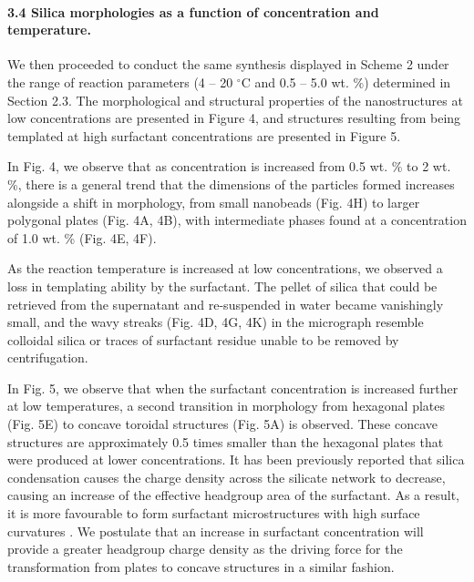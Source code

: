 \documentclass[a4paper,12pt,twocolumn]{article}
\begin{document}
  	\paragraph{3.4 Silica morphologies as a function of concentration and temperature.} We then proceeded to conduct the same synthesis displayed in Scheme 2 under the range of reaction parameters (4 -- 20 $^\circ$C and 0.5 -- 5.0 wt. \%) determined in Section 2.3. The morphological and structural properties of the nanostructures at low concentrations are presented in Figure 4, and structures resulting from being templated at high surfactant concentrations are presented in Figure 5.
  	
	
  	
  	In Fig. 4, we observe that as concentration is increased from 0.5 wt. \% to 2 wt. \%, there is a general trend that the dimensions of the particles formed increases alongside a shift in morphology, from small nanobeads (Fig. 4H) to larger polygonal plates (Fig. 4A, 4B), with intermediate phases found at a concentration of 1.0 wt. \% (Fig. 4E, 4F). 

  	As the reaction temperature is increased at low concentrations, we observed a loss in templating ability by the surfactant. The pellet of silica that could be retrieved from the supernatant and re-suspended in water became vanishingly small, and the wavy streaks (Fig. 4D, 4G, 4K) in the micrograph resemble colloidal silica or traces of surfactant residue unable to be removed by centrifugation.
  	
  	In Fig. 5, we observe that when the surfactant concentration is increased further at low temperatures, a second transition in morphology from hexagonal plates (Fig. 5E) to concave toroidal structures (Fig. 5A) is observed. These concave structures are approximately 0.5 times smaller than the hexagonal plates that were produced at lower concentrations. It has been previously reported that silica condensation causes the charge density across the silicate network to decrease, causing an increase of the effective headgroup area of the surfactant. As a result, it is more favourable to form surfactant microstructures with high surface curvatures \cite{che2005,israelachvili1976}. We postulate that an increase in surfactant concentration will provide a greater headgroup charge density as the driving force for the transformation from plates to concave structures in a similar fashion.
  	
\end{document}

